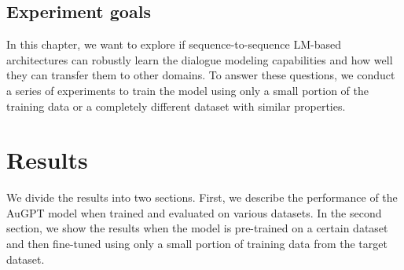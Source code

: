\subsection{Experiment goals}
In this chapter, we want to explore if sequence-to-sequence LM-based architectures can robustly learn the dialogue modeling capabilities and how well they can transfer them to other domains.
To answer these questions, we conduct a series of experiments to train the model using only a small portion of the training data or a completely different dataset with similar properties.

\section{Results}
We divide the results into two sections.
First, we describe the performance of the AuGPT model when trained and evaluated on various datasets.
In the second section, we show the results when the model is pre-trained on a certain dataset and then fine-tuned using only a small portion of training data from the target dataset.


